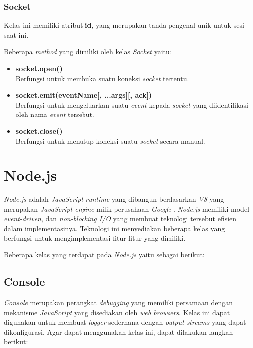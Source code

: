 \subsubsection{Socket}
Kelas ini memiliki atribut \textbf{id}, yang merupakan tanda pengenal unik untuk sesi saat ini.

Beberapa \textit{method} yang dimiliki oleh kelas \textit{Socket} yaitu: 

\begin{itemize}
	\item \textbf{socket.open()} \\ Berfungsi untuk membuka suatu koneksi \textit{socket} tertentu.
	\item \textbf{socket.emit(eventName[, ...args][, ack])} \\ Berfungsi untuk mengeluarkan suatu \textit{event} kepada \textit{socket} yang diidentifikasi oleh nama \textit{event} tersebut.
	\item \textbf{socket.close()} \\ Berfungsi untuk menutup koneksi suatu \textit{socket} secara manual. 
\end{itemize}


\section{Node.js}
\label{sec:Node.js}

\textit{Node.js} adalah \textit{JavaScript runtime} yang dibangun berdasarkan \textit{V8} yang merupakan \textit{JavaScript engine} milik perusahaan \textit{Google} \cite{nodejs}. \textit{Node.js} memiliki model \textit{event-driven}, dan \textit{non-blocking I/O} yang membuat teknologi tersebut efisien dalam implementasinya. Teknologi ini menyediakan beberapa kelas yang berfungsi untuk mengimplementasi fitur-fitur yang dimiliki.

Beberapa kelas yang terdapat pada \textit{Node.js} yaitu sebagai berikut: 

\subsection{Console}
\textit{Console} merupakan perangkat \textit{debugging} yang memiliki persamaan dengan mekanisme \textit{JavaScript} yang disediakan oleh \textit{web browsers}. Kelas ini dapat digunakan untuk membuat \textit{logger} sederhana dengan \textit{output streams} yang dapat dikonfigurasi. Agar dapat menggunakan kelas ini, dapat dilakukan langkah berikut: 

